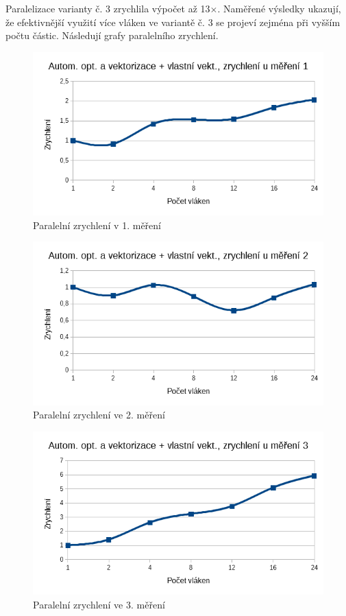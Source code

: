 \documentclass[12pt]{article}
\begin{document}
Paralelizace varianty č. 3 zrychlila výpočet až 13${\times}$. 
Naměřené výsledky ukazují, že efektivnější využití více vláken ve variantě č. 3 se projeví zejména při vyšším počtu částic.
Následují grafy paralelního zrychlení.

\begin{figure}[H]
  \begin{center}
     \includegraphics[width=12cm]{images/ssef1acc.png}
    \caption{Paralelní zrychlení v 1. měření} 
  \end{center}
\end{figure}

\begin{figure}[H]
  \begin{center}
     \includegraphics[width=12cm]{images/ssef2acc.png}
    \caption{Paralelní zrychlení ve 2. měření} 
  \end{center}
\end{figure}

\begin{figure}[H]
  \begin{center}
     \includegraphics[width=12cm]{images/ssef3acc.png}
    \caption{Paralelní zrychlení ve 3. měření} 
  \end{center}
\end{figure}
\end{document}
